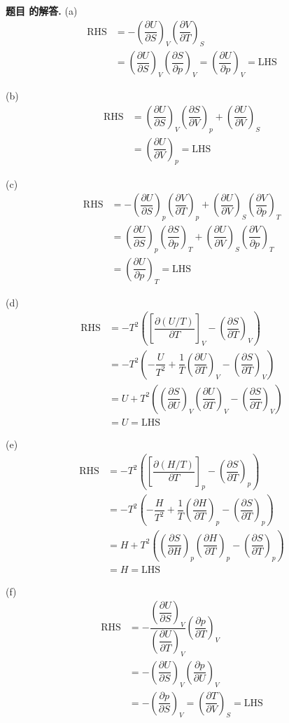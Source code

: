 \documentclass[12pt, a4paper, oneside]{ctexart}
\newcounter{problemname}
\newenvironment{solution}
  {\par\noindent\textbf{题目 \theproblemname 的解答. }}
  {\par}
\newcommand{\tpar}[3]{\left(\dfrac{\partial #1}{\partial #2}\right)_{#3}}
\begin{document}
\begin{solution}
  (a)
  \begin{align*}
    \mathrm{RHS} &= -\tpar{U}{S}{V} \tpar{V}{T}{S} \\
    &= \tpar{U}{S}{V} \tpar{S}{p}{V} = \tpar{U}{p}{V} = \mathrm{LHS}
  \end{align*}

  (b)
  \begin{align*}
    \mathrm{RHS} &= \tpar{U}{S}{V} \tpar{S}{V}{p} + \tpar{U}{V}{S} \\
    &=\tpar{U}{V}{p} = \mathrm{LHS}
  \end{align*}

  (c)
  \begin{align*}
    \mathrm{RHS} &= -\tpar{U}{S}{p} \tpar{V}{T}{p} + \tpar{U}{V}{S} \tpar{V}{p}{T} \\
    &= \tpar{U}{S}{p} \tpar{S}{p}{T} + \tpar{U}{V}{S} \tpar{V}{p}{T} \\
    &= \tpar{U}{p}{T} = \mathrm{LHS}
  \end{align*}

  (d)
  \begin{align*}
    \mathrm{RHS} &= -T^2 \left( \left[\dfrac{\partial(U/T)}{\partial T}\right]_V - \tpar{S}{T}{V}\right)\\
    &= -T^2 \left( -\dfrac{U}{T^2} + \dfrac{1}{T} \tpar{U}{T}{V} - \tpar{S}{T}{V}\right)\\
    &= U + T^2 \left(\tpar{S}{U}{V}\tpar{U}{T}{V} -\tpar{S}{T}{V} \right)\\
    &= U = \mathrm{LHS}
  \end{align*}

  (e)
  \begin{align*}
    \mathrm{RHS} &= -T^2 \left( \left[\dfrac{\partial(H/T)}{\partial T}\right]_p - \tpar{S}{T}{p}\right)\\
    &= -T^2 \left( -\dfrac{H}{T^2} + \dfrac{1}{T} \tpar{H}{T}{p} - \tpar{S}{T}{p}\right)\\
    &= H + T^2 \left(\tpar{S}{H}{p}\tpar{H}{T}{p} -\tpar{S}{T}{p} \right)\\
    &= H = \mathrm{LHS}
  \end{align*}

  (f)
  \begin{align*}
    \mathrm{RHS} &= -\dfrac{\tpar{U}{S}{V}}{\tpar{U}{T}{V}} \tpar{p}{T}{V} \\
    &= - \tpar{U}{S}{V} \tpar{p}{U}{V} \\
    &= - \tpar{p}{S}{V} = \tpar{T}{V}{S} = \mathrm{LHS}
  \end{align*}


\end{solution}
\end{document}
